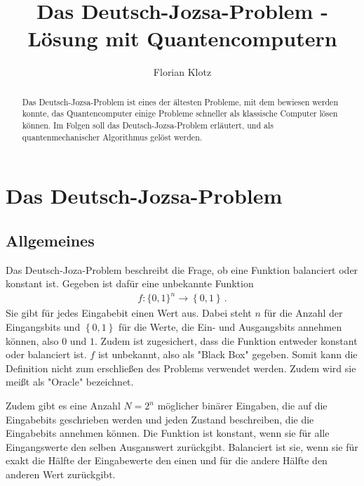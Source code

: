 \documentclass[10pt,aps,prb,twocolumn, nofootinbib]{revtex4-2}
\begin{document}
%

\newcommand{\curlybraces}[1]{\left\{#1\right\}}

\title{Das Deutsch-Jozsa-Problem - Lösung mit Quantencomputern}
\author{Florian Klotz}
\noaffiliation

\begin{abstract}
Das Deutsch-Jozsa-Problem ist eines der ältesten Probleme, mit dem bewiesen werden konnte, das
Quantencomputer einige Probleme schneller als klassische Computer lösen können. Im Folgen soll das
Deutsch-Jozsa-Problem erläutert, und als quantenmechanischer Algorithmus gelöst werden.

\end{abstract}

\maketitle

\section{Das Deutsch-Jozsa-Problem}

\subsection{Allgemeines}

Das Deutsch-Joza-Problem beschreibt die Frage, ob eine Funktion balanciert oder konstant ist. Gegeben ist
daf\"ur eine unbekannte Funktion
\begin{align*}
    f:\{0,1\}^n\rightarrow \curlybraces{0,1} \,.
\end{align*}
Sie gibt f\"ur jedes Eingabebit einen Wert aus. Dabei steht $n$ f\"ur die Anzahl der Eingangsbits und
$\curlybraces{0,1}$ f\"ur die Werte, die Ein- und Ausgangsbits annehmen k\"onnen, also $0$ und $1$. Zudem
ist zugesichert, dass die Funktion entweder konstant oder balanciert ist. $f$ ist unbekannt, also als
"Black Box" gegeben. Somit kann die Definition nicht zum erschließen des Problems verwendet werden. Zudem
wird sie meißt als "Oracle" bezeichnet.

Zudem gibt es eine Anzahl $N = 2^n$ möglicher bin\"arer Eingaben, die auf die Eingabebits geschrieben
werden und jeden Zustand beschreiben, die die Eingabebits annehmen k\"onnen.
Die Funktion ist konstant, wenn sie für alle Eingangswerte den selben Ausganswert zur\"uckgibt.
Balanciert ist sie, wenn sie f\"ur exakt die H\"alfte der Eingabewerte den einen und f\"ur die andere
H\"alfte den anderen Wert zur\"uckgibt.
\end{document}
